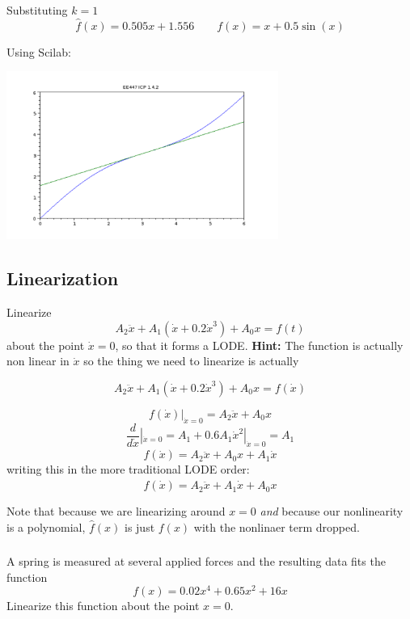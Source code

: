 \documentclass{article}	%
\begin{document}
\begin{solution}
Substituting $k=1$
\[
\hat{f}(x) = 0.505x + 1.556 \qquad f(x) = x + 0.5\sin(x)
\]

Using Scilab:

\includegraphics[width=3.5in]{icp142_plota.png}

\end{solution}


\subsection{Linearization}

 Linearize
\[
A_2 \ddot{x} + A_1(\dot{x}+0.2\dot{x}^3) + A_0x  = f(t)
\]
about the point $\dot{x} = 0$, so that it forms a LODE.
{\bf Hint: }  The function is actually non linear in $\dot{x}$ so the thing we need to linearize is actually

\[
A_2 \ddot{x} + A_1(\dot{x}+0.2\dot{x}^3) + A_0x  = f(\dot{x})
\]

\begin{solution}
\[
f(\dot{x}) |_{\dot{x} = 0}  = A_2\ddot{x} + A_0x
\]
\[
\frac{d}{d\dot{x}}|_{\dot{x}=0} = A_1 + 0.6A_1\dot{x}^2  |_{\dot{x} = 0} = A_1
\]
\[
\hat{f}(\dot{x}) = A_2 \ddot{x} + A_0 x + A_1\dot{x}
\]
writing this in the more traditional LODE order:
\[
\hat{f}(\dot{x}) = A_2 \ddot{x}+ A_1\dot{x} + A_0 x
\]

Note that because we are linearizing around $x=0$ {\it and} because our nonlinearity is a polynomial,   $\hat{f}(x)$ is just $f(x)$ with the nonlinaer term dropped.

\end{solution}

\subsubsection{} \label{LinearizePtwo} A spring is measured at several applied forces and the resulting data fits the function
\[
f(x) =0.02x^4  +  0.65x^2+ 16x
\]
Linearize this function about the point $x=0$.
\end{document}
